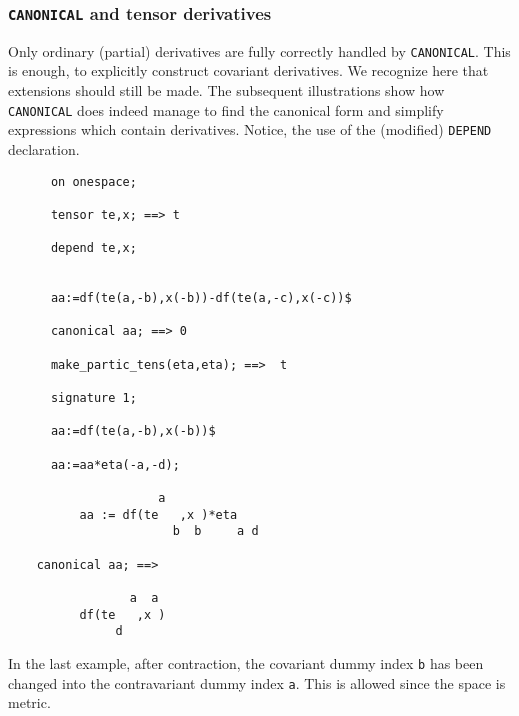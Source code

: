 \subsubsection{\texttt{CANONICAL} and tensor derivatives}

Only ordinary (partial) derivatives are fully correctly handled
by \texttt{CANONICAL}. This is enough, to explicitly construct covariant
derivatives. We recognize here  that extensions should still be made.
The subsequent illustrations show how \texttt{CANONICAL} does indeed
manage to find  the canonical form and simplify  expressions
which contain derivatives. Notice, the use of
the (modified) \texttt{DEPEND}  declaration.
\begin{verbatim}
      on onespace;

      tensor te,x; ==> t

      depend te,x;


      aa:=df(te(a,-b),x(-b))-df(te(a,-c),x(-c))$

      canonical aa; ==> 0

      make_partic_tens(eta,eta); ==>  t

      signature 1;

      aa:=df(te(a,-b),x(-b))$

      aa:=aa*eta(-a,-d);

                     a
          aa := df(te   ,x )*eta
                       b  b     a d

    canonical aa; ==>

                 a  a
          df(te   ,x )
               d
\end{verbatim}
In the last example, after contraction, the covariant dummy index \texttt{b}
has been changed into the contravariant dummy index \texttt{a}. This is allowed
since the space is metric.
